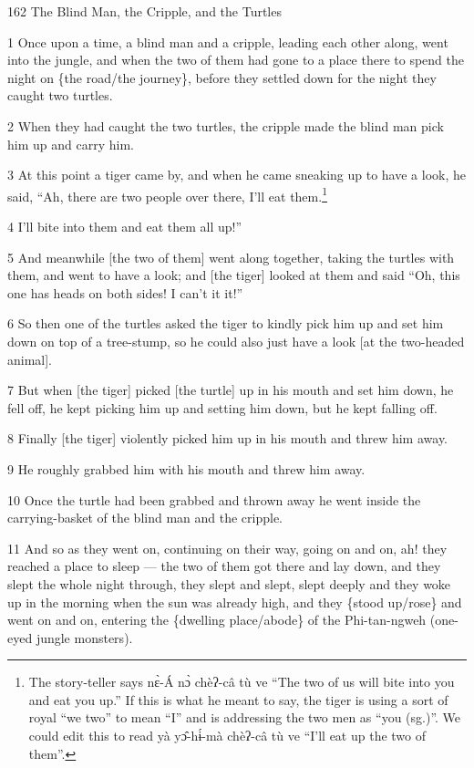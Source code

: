 
162 The Blind Man, the Cripple, and the Turtles

1 Once upon a time, a blind man and a cripple, leading each other along, went into
the jungle, and when the two of them had gone to a place there to spend the night
on \{the road/the journey\}, before they settled down for the night they caught
two turtles.

2 When they had caught the two turtles, the cripple made the blind man pick him
up and carry him.

3 At this point a tiger came by, and when he came sneaking up to have a look, he
said, ``Ah, there are two people over there, I'll eat them.\footnote{The story-teller says nɛ̀-Á nɔ̀ chèʔ-câ tù ve ``The two of us will bite into you and eat you up.'' If this is what he meant to say, the tiger is using a sort of royal ``we two'' to mean ``I'' and is addressing the two men as ``you (sg.)''. We could edit this to read yà yɔ̂-hɨ́-mà chèʔ-câ tù ve ``I'll eat up the two of them''.}

4 I'll bite into them and eat them all up!''

5 And meanwhile [the two of them] went along together, taking the turtles with
them, and went to have a look; and [the tiger] looked at them and said ``Oh, this
one has heads on both sides! I can't it it!''

6 So then one of the turtles asked the tiger to kindly pick him up and set him
down on top of a tree-stump, so he could also just have a look [at the two-headed
animal].

7 But when [the tiger] picked [the turtle] up in his mouth and set him down, he
fell off, he kept picking him up and setting him down, but he kept falling off.

8 Finally [the tiger] violently picked him up in his mouth and threw him away.

9 He roughly grabbed him with his mouth and threw him away.

10 Once the turtle had been grabbed and thrown away he went inside the carrying-basket
of the blind man and the cripple.

11 And so as they went on, continuing on their way, going on and on, ah! they reached
a place to sleep --- the two of them got there and lay down, and they slept the
whole night through, they slept and slept, slept deeply and they woke up in the
morning when the sun was already high, and they \{stood up/rose\} and went on and
on, entering the \{dwelling place/abode\} of the Phi-tan-ngweh (one-eyed jungle
monsters).

